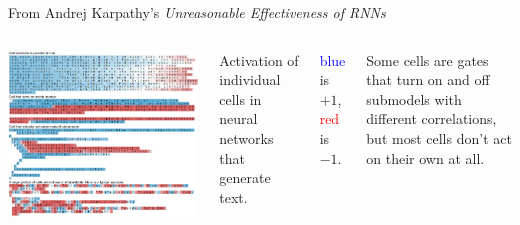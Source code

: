 \documentclass[aspectratio=169]{beamer}
\begin{document}
\begin{frame}{From Andrej Karpathy's {\it Unreasonable Effectiveness of RNNs}}
\Large
\vspace{0.3 cm}
\begin{columns}
\includegraphics[width=\linewidth]{pane1.png}

Activation of individual cells in neural networks that generate text.

\vspace{0.5 cm}
\textcolor{blue}{blue} is $+1$, \textcolor{red}{red} is $-1$.

\large
\vspace{0.5 cm}
Some cells are gates that turn on and off submodels with different correlations, but most cells don't act on their own at all.
\end{columns}
\end{frame}
\end{document}
